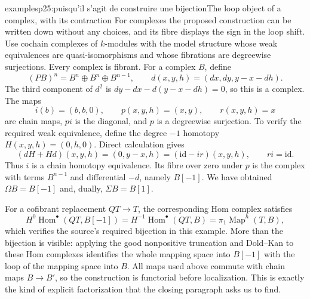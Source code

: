 \begin{dcomment}{examples}{p25:puisqu'il s'agit de construire une bijection}{The loop object of a complex, with its contraction}
For complexes the proposed construction can be written down without any choices, and its fibre displays the sign in the loop shift. Use cochain complexes of $k$-modules with the model structure whose weak equivalences are quasi-isomorphisms and whose fibrations are degreewise surjections. Every complex is fibrant. For a complex $B$, define
\[
 (P B)^n=B^n\oplus B^n\oplus B^{n-1},\qquad
 d(x,y,h)=(dx,dy,y-x-dh).
\]
The third component of $d^2$ is $dy-dx-d(y-x-dh)=0$, so this is a complex. The maps
\[
 i(b)=(b,b,0),\qquad p(x,y,h)=(x,y),\qquad r(x,y,h)=x
\]
are chain maps, $pi$ is the diagonal, and $p$ is a degreewise surjection. To verify the required weak equivalence, define the degree $-1$ homotopy $H(x,y,h)=(0,h,0)$. Direct calculation gives
\[
 (dH+Hd)(x,y,h)=(0,y-x,h)
               =(\mathrm{id}-ir)(x,y,h),\qquad ri=\mathrm{id}.
\]
Thus $i$ is a chain homotopy equivalence. Its fibre over zero under $p$ is the complex with terms $B^{n-1}$ and differential $-d$, namely $B[-1]$. We have obtained $\Omega B=B[-1]$ and, dually, $\Sigma B=B[1]$.

For a cofibrant replacement $Q T\to T$, the corresponding Hom complex satisfies
\[
 H^0\operatorname{Hom}^\bullet(QT,B[-1])
   =H^{-1}\operatorname{Hom}^\bullet(QT,B)
   =\pi_1\operatorname{Map}^{h}(T,B),
\]
which verifies the source's required bijection in this example. More than the bijection is visible: applying the good nonpositive truncation and Dold--Kan to these Hom complexes identifies the whole mapping space into $B[-1]$ with the loop of the mapping space into $B$. All maps used above commute with chain maps $B\to B'$, so the construction is functorial before localization. This is exactly the kind of explicit factorization that the closing paragraph asks us to find.
\end{dcomment}


